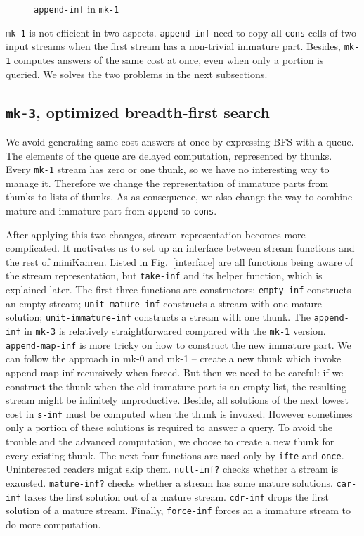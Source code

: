 \documentclass[format=acmlarge, review=true, authordraft=true]{acmart}
\begin{document}
\begin{figure}
	 	
	 \caption{\texttt{append-inf} in \texttt{mk-1}}
	 \label{append-inf-1}
\end{figure}

\texttt{mk-1} is not efficient in two aspects. \texttt{append-inf} need to copy all \texttt{cons} cells of two input streams when the first stream has a non-trivial immature part. Besides, \texttt{mk-1} computes answers of the same cost at once, even when only a portion is queried. We solves the two problems in the next subsections.

\subsection{\texttt{mk-3}, optimized breadth-first search}

We avoid generating same-cost answers at once by expressing BFS with a queue. The elements of the queue are delayed computation, represented by thunks. Every \texttt{mk-1} stream has zero or one thunk, so we have no interesting way to manage it. Therefore we change the representation of immature parts from thunks to lists of thunks. As as consequence, we also change the way to combine mature and immature part from \texttt{append} to \texttt{cons}. 

After applying this two changes, stream representation becomes more complicated. It motivates us to set up an interface between stream functions and the rest of miniKanren. Listed in Fig.~\ref{interface} are all functions being aware of the stream representation, but \texttt{take-inf} and its helper function, which is explained later. The first three functions are constructors: \texttt{empty-inf} constructs an empty stream; \texttt{unit-mature-inf} constructs a stream with one mature solution; \texttt{unit-immature-inf} constructs a stream with one thunk. The \texttt{append-inf} in \texttt{mk-3} is relatively straightforwared compared with the \texttt{mk-1} version. \texttt{append-map-inf} is more tricky on how to construct the new immature part. We can follow the approach in mk-0 and mk-1 -- create a new thunk which invoke append-map-inf recursively when forced. But then we need to be careful: if we construct the thunk when the old immature part is an empty list, the resulting stream might be infinitely unproductive. Beside, all solutions of the next lowest cost in \texttt{s-inf} must be computed when the thunk is invoked. However sometimes only a portion of these solutions is required to answer a query. To avoid the trouble and the advanced computation, we choose to create a new thunk for every existing thunk. The next four functions are used only by \texttt{ifte} and \texttt{once}. Uninterested readers might skip them. \texttt{null-inf?} checks whether a stream is exausted. \texttt{mature-inf?} checks whether a stream has some mature solutions. \texttt{car-inf} takes the first solution out of a mature stream. \texttt{cdr-inf} drops the first solution of a mature stream. Finally, \texttt{force-inf} forces an a immature stream to do more computation.
\end{document}
